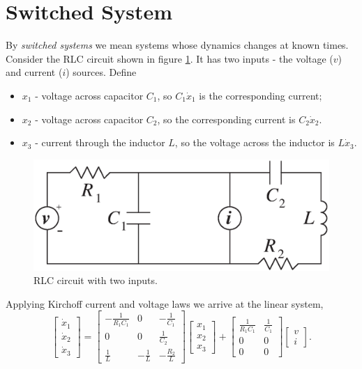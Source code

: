 \section{Switched System}
By {\it switched systems} we mean systems whose dynamics
changes at known times. Consider the RLC circuit shown in figure \ref{rlcfig}.
It has two inputs - the voltage ($v$) and current ($i$) sources.
Define
\begin{itemize}
\item $x_1$ - voltage across capacitor $C_1$, so $C_1\dot{x}_1$ is
the corresponding current;
\item $x_2$ - voltage across capacitor $C_2$, so the corresponding
current is $C_2\dot{x}_2$.
\item $x_3$ - current through the inductor $L$, so the voltage across
the inductor is $L\dot{x}_3$.
\end{itemize}
\begin{figure}[htbp]
\centerline{
\includegraphics[height=5 cm]{rlc.eps}}
\caption{RLC circuit with two inputs.}
\label{rlcfig}
\end{figure}
Applying Kirchoff current and voltage laws we arrive at the linear system,
\begin{equation}
\left[\begin{array}{c}
\dot{x}_1\\
\dot{x}_2\\
\dot{x}_3\end{array}\right] = \left[\begin{array}{ccc}
-\frac{1}{R_1C_1} & 0 & -\frac{1}{C_1}\\
0 & 0 & \frac{1}{C_2}\\
\frac{1}{L} & -\frac{1}{L} & -\frac{R_2}{L}\end{array}\right]
\left[\begin{array}{c}
x_1\\
x_2\\
x_3\end{array}\right] + \left[\begin{array}{cc}
\frac{1}{R_1C_1} & \frac{1}{C_1}\\
0 & 0\\
0 & 0\end{array}\right]\left[\begin{array}{c}
v\\
i\end{array}\right]. \label{rlceq}
\end{equation}
